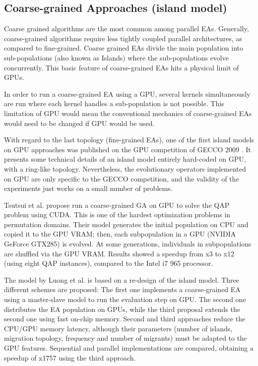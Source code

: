 \documentclass[prodmode,acmtecs]{acmsmall}
\begin{document}
\subsection{Coarse-grained Approaches (island model)}

Coarse grained algorithms are the most common among parallel EAs. Generally, coarse-grained algorithms require less tightly coupled parallel architectures, as compared to fine-grained. Coarse grained EAs divide the main population into sub-populations (also known as Islands) where the sub-populations evolve concurrently. This basic feature of coarse-grained EAs hits a physical limit of GPUs. 

In order to run a coarse-grained EA using a GPU, several kernels simultaneously are run where each kernel handles a sub-population is not possible. This limitation of GPU would mean the conventional mechanics of coarse-grained EAs would need to be changed if GPU would be used.

With regard to the last topology (fine-grained EAs), one of the first island models on GPU approaches was published on the GPU competition of GECCO 2009 \cite{gecco2009CompetitionPospichal}. It presents some technical details of an island model entirely hard-coded on GPU, with a ring-like topology. Nevertheless, the evolutionary operators implemented on GPU are only specific to the GECCO competition, and the validity of the experiments just works on a small number of problems.

Tsutsui et al. \cite{1570355} propose run a coarse-grained GA on GPU to solve the QAP problem using CUDA. This is one of the hardest optimization problems in permutation domains. 
Their model generates the initial population on CPU and copied it to the GPU VRAM; then, each subpopulation in a GPU (NVIDIA GeForce GTX285) is evolved. At some generations, individuals in subpopulations are shuffled via the GPU VRAM. 
Results showed a speedup from x3 to x12 (using eight QAP instances), compared to the Intel i7 965 processor. 

The model by Luong et al. \cite{LUONG:2010:INRIA-00520464:1} is based on a re-design of the island model.
Three different schemes are proposed: The first one implements a coarse-grained EA using a master-slave model to run the evaluation step on GPU. The second one distributes the EA population on GPUs, while the third proposal extends the second one using fast on-chip memory. 
Second and third approaches reduce the CPU/GPU memory latency, although their parameters (number of islands, migration topology, frequency and number of migrants) must be adapted to the GPU features. 
Sequential and parallel implementations are compared, obtaining a speedup of x1757 using the third approach.
\end{document}
